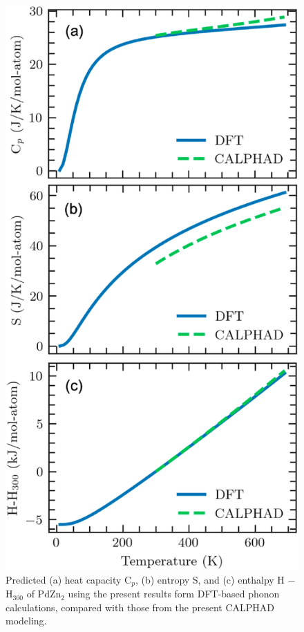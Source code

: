 \begin{figure}[H]
    \centering
    \includegraphics[width=0.45\linewidth]{intermetallics/Intermetallics-PdZnQHAPdZn2.jpg}
    \caption{Predicted (a) heat capacity C$_p$, (b) entropy S, and (c) enthalpy H $-$ H$_{300}$ of PdZn$_2$ using the present results form DFT-based phonon calculations, compared with those from the present CALPHAD modeling.}
    \label{intermetallics:fig:PdZnQHAPdZn2}
\end{figure}

